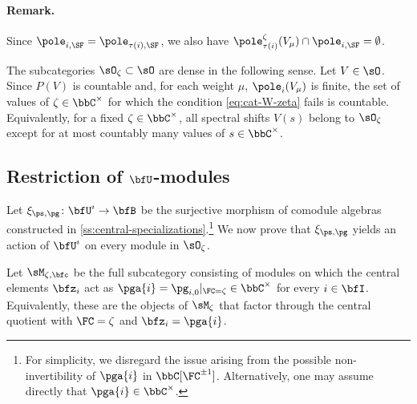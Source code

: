 \documentclass[reqno]{amsart}
\numberwithin{equation}{section}
\newenvironment{remark}{\medskip\paragraph{{\bf Remark.}}}{\par\medskip}
\begin{document}
\begin{remark}
Since $\pole_{i,\SF}=\pole_{\tau(i),\SF}$, we also have
$\pole_{\tau(i)}^\zeta(V_\mu)\cap\pole_{i,\SF}=\emptyset$.
\hfill\rmkend	
\end{remark}

The subcategories $\sO_\zeta\subset\sO$ are dense in the following sense. Let
$V\in\sO$. Since $P(V)$ is countable and, for each weight $\mu$, $\pole_i(V_\mu)$ is finite, the set of values of $\zeta\in\bbC^\times$
for which the condition \eqref{eq:cat-W-zeta} fails is countable. Equivalently, for a
fixed $\zeta\in\bbC^\times$, all spectral shifts $V(s)$ belong to
$\sO_\zeta$ except for at most countably many values of
$s\in\bbC^\times$.

\subsection{Restriction of $\bfU$-modules}\label{ss:QSP-contour-restriction}
Let $\xi_{\ps,\pg}\colon\bfU^\imath\to\bfB$ be the surjective morphism of comodule algebras constructed in \ref{ss:central-specializations}.\footnote{
For simplicity, we disregard the issue arising from the possible non-invertibility of $\pga{i}$ in $\bbC[\FC^{\pm1}]$. Alternatively, one may assume directly that $\pga{i}\in\bbC^\times$.}
We now prove that $\xi_{\ps,\pg}$ yields an action of $\bfU^\imath$ on every module 
in $\sO_\zeta$.

Let $\sM_{\zeta,\bfc}$ be the full subcategory consisting of modules
on which the central elements $\bfz_i$ act as $\pga{i}=\pg_{i,0}|_{\FC=\zeta}\in\bbC^\times$ for every $i\in\bfI$. Equivalently,
	these are the objects of $\sM_\zeta$ that factor through the central
	quotient with $\FC=\zeta$ and $\bfz_i=\pga{i}$. 
\end{document}
